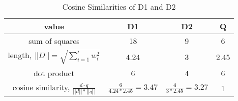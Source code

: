 \documentclass[11pt]{article}
\begin{document}
\begin{enumerate}
        {\renewcommand{\arraystretch}{3}
        \begin{table}[htbp]
            \begin{center}
                \caption{Cosine Similarities of D1 and D2}
                \begin{tabular}{| c | c | c | c |}
                \hline
                \textbf{value} & \textbf{D1} & \textbf{D2} & \textbf{Q} \\
                \hline
                sum of squares  & 18 & 9 & 6 \\
                \hline
                length, $||D|| = \sqrt{\sum_{i=1}^{t}{w_i^2}}$  & 4.24 & 3 & 2.45 \\
                \hline
                dot product     & 6 & 4 & 6 \\
                \hline
                cosine similarity, $\frac{d \cdot q}{||d||*||q||}$ & $\frac{6}{4.24*2.45}=3.47$ & $\frac{4}{3*2.45}=3.27$ & 1 \\
                \hline
                \end{tabular}
            \end{center}
        \end{table}}

    \end{enumerate}
\end{document}
